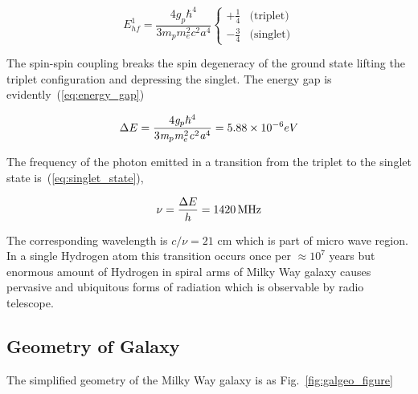 \documentclass[fleqn,usenatbib]{mnras}
\begin{document}
\begin{equation}
\label{eq:total_spin}
 \mathit{E}_{hf}^{1}=\frac{4\mathit{g}_{p}\mathit{\hbar}^{4}}{3\mathit{m}_{p}\mathit{m}_{e}^{2}\mathit{c}^{2}\mathit{a}^{4}}\begin{cases}
 +\frac{1}{4}& \text{(triplet)}\\
 -\frac{3}{4}& \text{(singlet)}
\end{cases} 
\end{equation}

The spin-spin coupling breaks the spin degeneracy of the ground state lifting the triplet configuration and depressing the singlet. The energy gap is evidently~(\ref{eq:energy_gap})

\begin{equation}
 \Delta\-E=\frac{4\mathit{g}_{p}\mathit{\hbar}^{4}}{3\mathit{m}_{p}\mathit{m}_{e}^{2}\mathit{c}^{2}\mathit{a}^{4}}=5.88\times10^{-6} eV
 \label{eq:energy_gap}
\end{equation}


The frequency of the photon emitted in a transition from the triplet to the singlet state is~(\ref{eq:singlet_state}),

\begin{equation}
 \mathit{\nu}=\frac{\Delta\-E}{h}=\SI{1420}{MHz}
 \label{eq:singlet_state}
\end{equation}

The corresponding wavelength is $c/\nu=21$ cm which is part of micro wave region. In a single Hydrogen atom this transition occurs once per $\approx10^{7}$ years but enormous amount of Hydrogen in spiral arms of Milky Way galaxy causes pervasive and ubiquitous forms of radiation which is observable by radio telescope.

\subsection{Geometry of Galaxy}

The simplified geometry of the Milky Way galaxy\citep{CathyHorellou2015} is as Fig.~\ref{fig:galgeo_figure}
\end{document}
